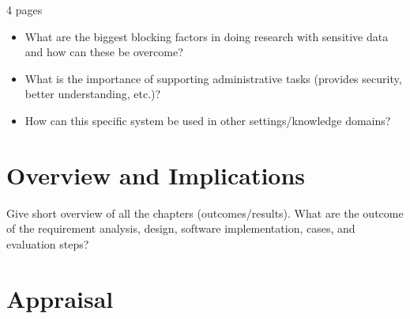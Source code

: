 4 pages

\begin{itemize}
	\item What are the biggest blocking factors in doing research with sensitive data and how can these be overcome?
	\item What is the importance of supporting administrative tasks (provides security, better understanding, etc.)? 
	\item How can this specific system be used in other settings/knowledge domains?
\end{itemize}

\section{Overview and Implications}
Give short overview of all the chapters (outcomes/results).
What are the outcome of the requirement analysis, design, software implementation, cases, and evaluation steps?


\section{Appraisal}
